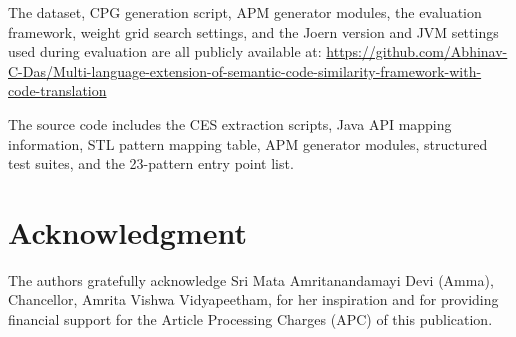 The dataset, CPG generation script, APM generator modules, the evaluation framework, weight grid search settings, and the Joern version and JVM settings used during evaluation are all publicly available at:
\url{https://github.com/Abhinav-C-Das/Multi-language-extension-of-semantic-code-similarity-framework-with-code-translation}

The source code includes the CES extraction scripts, Java API mapping information, STL pattern mapping table, APM generator modules, structured test suites, and the 23-pattern entry point list.

\section*{Acknowledgment}
The authors gratefully acknowledge Sri Mata Amritanandamayi Devi (Amma), Chancellor, Amrita Vishwa Vidyapeetham, for her inspiration and for providing financial support for the Article Processing Charges (APC) of this publication.